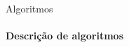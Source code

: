 \documentclass{beamer}
\begin{document}
\begin{frame}{Algoritmos}
	\framesubtitle{Descrição de algoritmos}
	\begin{figure}

\end{figure}
\end{frame}
\end{document}
